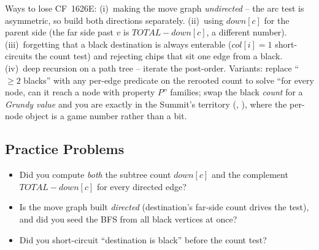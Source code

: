 
\begin{warningbox}
Ways to lose CF~1626E: (i)~making the move graph \emph{undirected} -- the arc test
is asymmetric, so build both directions separately. (ii)~using $\mathit{down}[c]$
for the parent side (the far side past $v$ is $\mathit{TOTAL}-\mathit{down}[c]$, a
different number). (iii)~forgetting that a black destination is always enterable
($\mathit{col}[i]=1$ short-circuits the count test) and rejecting chips that sit one
edge from a black. (iv)~deep recursion on a path tree -- iterate the post-order.
Variants: replace ``$\ge2$ blacks'' with any per-edge predicate on the rerooted
count to solve ``for every node, can it reach a node with property $P$'' families;
swap the black \emph{count} for a \emph{Grundy value} and you are exactly in the
Summit's territory (, ), where the
per-node object is a game number rather than a bit.
\end{warningbox}

\subsection{Practice Problems}

\begin{stuckbox}
\begin{itemize}[nosep, leftmargin=1.4em]
  \item Did you compute \emph{both} the subtree count $\mathit{down}[c]$ and the
        complement $\mathit{TOTAL}-\mathit{down}[c]$ for every directed edge?
  \item Is the move graph built \emph{directed} (destination's far-side count
        drives the test), and did you seed the BFS from all black vertices at once?
  \item Did you short-circuit ``destination is black'' before the count test?
\end{itemize}
\end{stuckbox}

